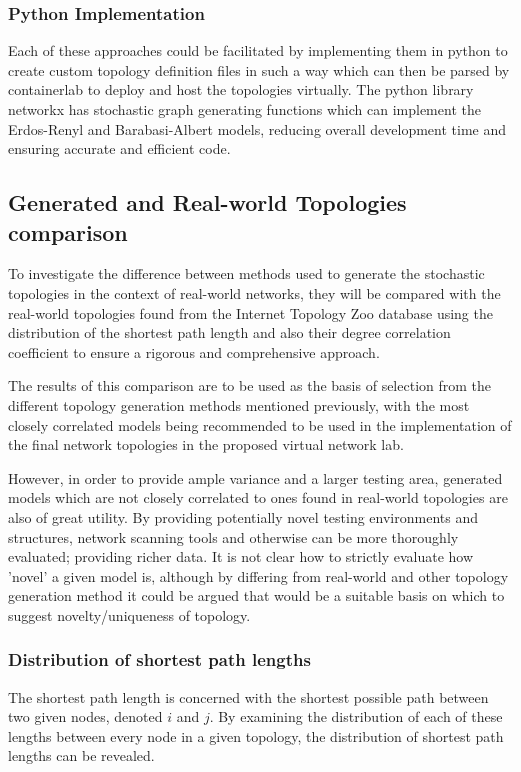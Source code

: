 \subsubsection{Python Implementation}
Each of these approaches could be facilitated by implementing them in python to create custom topology definition files in such a way which can then be parsed by containerlab to deploy and host the topologies virtually. 
The python library networkx \cite{networkX} has stochastic graph generating functions which can implement the Erdos-Renyl and Barabasi-Albert models, reducing overall development time and ensuring accurate and efficient code. 

\subsection{Generated and Real-world Topologies comparison}
To investigate the difference between methods used to generate the stochastic topologies in the context of real-world networks, they will be compared with the real-world topologies found from the Internet Topology Zoo database using the distribution of the shortest path length and also their degree correlation coefficient to ensure a rigorous and comprehensive approach.


The results of this comparison are to be used as the basis of selection from the different topology generation methods mentioned previously, with the most closely correlated models being recommended to be used in the implementation of the final network topologies in the proposed virtual network lab. 

However, in order to provide ample variance and a larger testing area, generated models which are not closely correlated to ones found in real-world topologies are also of great utility. By providing potentially novel testing environments and structures, network scanning tools and otherwise can be more thoroughly evaluated; providing richer data. It is not clear how to strictly evaluate how 'novel' a given model is, although by differing from real-world and other topology generation method it could be argued that would be a suitable basis on which to suggest novelty/uniqueness of topology.

\subsubsection{Distribution of shortest path lengths}
The shortest path length is concerned with the shortest possible path between two given nodes, denoted $i$ and $j$.  By examining the distribution of each of these lengths between every node in a given topology, the distribution of shortest path lengths can be revealed. 


